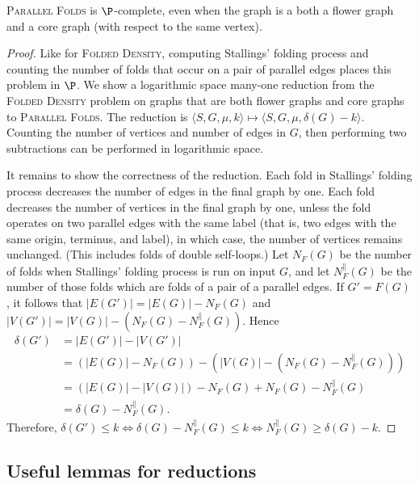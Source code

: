 \documentclass{article}
\newcommand{\FD}{\textsc{Folded Density}}
\newcommand{\PFolds}{\textsc{Parallel Folds}}
\begin{document}
\begin{theorem}
  \PFolds{} is $\P$-complete, even when the graph is a both a flower graph and a core graph (with respect to the same vertex).
\end{theorem}
\begin{proof}
  Like for \FD, computing Stallings' folding process and counting the number of folds that occur on a pair of parallel edges places this problem in $\P$.
  We show a logarithmic space many-one reduction from the \FD{} problem on graphs that are both flower graphs and core graphs to \PFolds{}.
  The reduction is $\langle S, G, \mu, k \rangle \mapsto \langle S, G, \mu, \delta(G) - k \rangle$.
  Counting the number of vertices and number of edges in $G$, then performing two subtractions can be performed in logarithmic space.

  It remains to show the correctness of the reduction.
  Each fold in Stallings' folding process decreases the number of edges in the final graph by one.
  Each fold decreases the number of vertices in the final graph by one, unless the fold operates on two parallel edges with the same label (that is, two edges with the same origin, terminus, and label), in which case, the number of vertices remains unchanged.
  (This includes folds of double self-loops.)
  Let $N_F(G)$ be the number of folds when Stallings' folding process is run on input $G$, and let $N^\|_F(G)$ be the number of those folds which are folds of a pair of a parallel edges.
  If $G' = F(G)$, it follows that $|E(G')| = |E(G)| - N_F(G)$ and $|V(G')| = |V(G)| - (N_F(G) - N^\|_F(G))$.
  Hence
  \begin{align*}
    \delta(G') & = |E(G')| - |V(G')| \\
    & = (|E(G)| - N_F(G)) - (|V(G)| - (N_F(G) - N^\|_F(G))) \\
    & = (|E(G)| - |V(G)|) - N_F(G) + N_F(G) - N^\|_F(G) \\
    & = \delta(G) - N^\|_F(G).
  \end{align*}
  Therefore, $\delta(G') \leq k \iff \delta(G) - N^\|_F(G) \leq k \iff N^\|_F(G) \geq \delta(G) - k$.
\end{proof}

\subsection{Useful lemmas for reductions}
\end{document}
